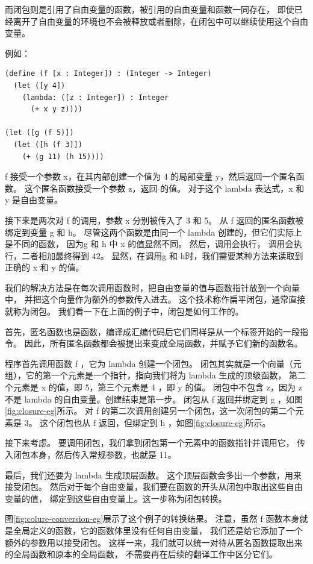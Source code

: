 而闭包则是引用了自由变量的函数，被引用的自由变量和函数一同存在，
即使已经离开了自由变量的环境也不会被释放或者删除，在闭包中可以继续使用这个自由变量。

例如：
\begin{lstlisting}
(define (f [x : Integer]) : (Integer -> Integer)
  (let ([y 4])
    (lambda: ([z : Integer]) : Integer
      (+ x y z))))

(let ([g (f 5)])
  (let ([h (f 3)])
    (+ (g 11) (h 15))))
\end{lstlisting}

f 接受一个参数 x，在其内部创建一个值为 4 的局部变量 y，然后返回一个匿名函数。
这个匿名函数接受一个参数 z，返回  的值。
对于这个 lambda 表达式，x 和 y 是自由变量。

接下来是两次对 f 的调用，参数 x 分别被传入了 3 和 5。
从 f 返回的匿名函数被绑定到变量 g 和 h。
尽管这两个函数是由同一个 lambda 创建的，但它们实际上是不同的函数，
因为g 和 h 中 x 的值显然不同。
然后，调用会执行，
调用会执行，二者相加最终得到 42。
显然，在调用g 和 h时，我们需要某种方法来读取到正确的 x 和 y 的值。

我们的解决方法是在每次调用函数时，把自由变量的值与函数指针放到一个向量中，
并把这个向量作为额外的参数传入进去。
这个技术称作扁平闭包\cite{Cardelli_1983}，通常直接就称为闭包。
我们看一下在上面的例子中，闭包是如何工作的。

首先，匿名函数也是函数，编译成汇编代码后它们同样是从一个标签开始的一段指令。
因此，所有匿名函数都会被提出来变成全局函数，并赋予它们新的函数名。

程序首先调用函数 f ，它为 lambda 创建一个闭包。
闭包其实就是一个向量（元组），它的第一个元素是一个指针，指向我们将为 lambda 生成的顶级函数，
第二个元素是 x 的值，即 5，第三个元素是 4 ，即 y 的值。
闭包中不包含 z，因为 z 不是 lambda 的自由变量。创建结束是第一步。
闭包从 f 返回并绑定到 g ，如图\ref{fig:closure-eg}所示。
对 f 的第二次调用创建另一个闭包，这一次闭包的第二个元素是 3。
这个闭包也从 f 返回，但绑定到 h ，如图\ref{fig:closure-eg}所示。

接下来考虑。
要调用闭包，我们拿到闭包第一个元素中的函数指针并调用它，
传入闭包本身，然后传入常规参数，也就是 11。

最后，我们还要为 lambda 生成顶层函数。
这个顶层函数会多出一个参数，用来接受闭包。
然后对于每个自由变量，我们要在函数的开头从闭包中取出这些自由变量的值，
绑定到这些自由变量上。这一步称为闭包转换。

图\ref{fig:colure-conversion-eg}展示了这个例子的转换结果。
注意，虽然 f 函数本身就是全局定义的函数，它的函数体里没有任何自由变量，
我们还是给它添加了一个额外的参数用以接受闭包。
这样一来，我们就可以统一对待从匿名函数提取出来的全局函数和原本的全局函数，
不需要再在后续的翻译工作中区分它们。

